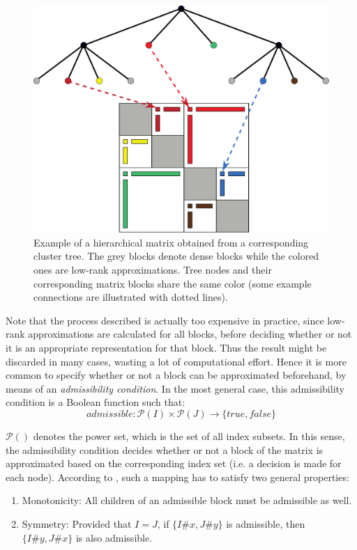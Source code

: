 \begin{figure}[h]
    \centering
    \includegraphics[width=0.9\linewidth]{chapters/4_hierarchical_matrices/figures/hierarchical_cluster.pdf}
    \caption[Hierarchical Matrix from Cluster Tree]{Example of a hierarchical matrix obtained from a corresponding cluster tree. The grey blocks denote dense blocks while the colored ones are low-rank approximations. Tree nodes and their corresponding matrix blocks share the same color (some example connections are illustrated with dotted lines).}
    \label{fig:hierarchical_cluster}
\end{figure}

Note that the process described is actually too expensive in practice, since low-rank approximations are calculated for all blocks, before deciding whether or not it is an appropriate representation for that block. Thus the result might be discarded in many cases, wasting a lot of computational effort. Hence it is more common to specify whether or not a block can be approximated beforehand, by means of an \textit{admissibility condition}. In the most general case, this admissibility condition is a Boolean function such that:
\begin{equation}
\label{eqn:admissibility}
    admissible: \mathcal{P}(I)\times \mathcal{P}(J) \rightarrow \{true, false\}
\end{equation}

\noindent $\mathcal{P}()$ denotes the power set, which is the set of all index subsets. In this sense, the admissibility condition decides whether or not a block of the matrix is approximated based on the corresponding index set (i.e. a decision is made for each node). According to \cite{hackbusch_hierarchical_2015}, such a mapping has to satisfy two general properties:
\begin{enumerate}
    \item Monotonicity: All children of an admissible block must be admissible as well.
    \item Symmetry: Provided that $I=J$, if $\{I\#x,J\#y\}$ is admissible, then $\{I\#y,J\#x\}$ is also admissible.
\end{enumerate}


